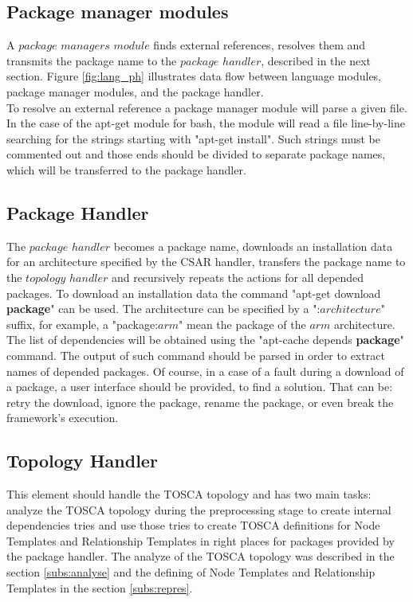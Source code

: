 \subsection{Package manager modules} \label{subs:archpmm}
A $package$ $managers$ $module$ finds external references, resolves them and transmits the package name to the $package$ $handler$, described in the next section.
Figure \ref{fig:lang_ph} illustrates data flow between language modules, package manager modules, and the package handler.\\
To resolve an external reference a package manager module will parse a given file. 
In the case of the apt-get module for bash, the module will read a file line-by-line searching for the strings starting with "apt-get install".
Such strings must be commented out and those ends should be divided to separate package names, which will be transferred to the package handler. 


\subsection{Package Handler} \label{subs:archph}
The $package$ $handler$ becomes a package name, downloads an installation data for an architecture specified by the CSAR handler, transfers the package name to the $topology$ $handler$ and recursively repeats the actions for all depended packages. 
To download an installation data the command "apt-get download \textbf{package}" can be used. 
The architecture can be specified by a ":$architecture$" suffix, for example, a "package:$arm$" mean the package of the $arm$ architecture.
The list of dependencies will be obtained using the "apt-cache depends \textbf{package}" command. 
The output of such command should be parsed in order to extract names of depended packages.
Of course, in a case of a fault during a download of a package, a user interface should be provided, to find a solution.
That can be: retry the download, ignore the package, rename the package, or even break the framework's execution.

\subsection{Topology Handler} \label{subs:archtop}
This element should handle the TOSCA topology and has two main tasks: analyze the TOSCA topology during the preprocessing stage to create internal dependencies tries and use those tries to create TOSCA definitions for Node Templates and Relationship Templates in right places for packages provided by the package handler.
The analyze of the TOSCA topology was described in the section \ref{subs:analyse} and the defining of Node Templates and Relationship Templates in the section \ref{subs:repres}.
